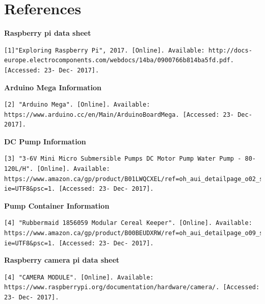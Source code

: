 \documentclass [10pt]{article}
\begin{document}
\section{References}


\textbf{Raspberry pi data sheet}
\begin{verbatim}
[1]"Exploring Raspberry Pi", 2017. [Online]. Available: http://docs-europe.electrocomponents.com/webdocs/14ba/0900766b814ba5fd.pdf. [Accessed: 23- Dec- 2017].
\end{verbatim}
\textbf{Arduino Mega Information}
\begin{verbatim}
[2] "Arduino Mega". [Online]. Available:
https://www.arduino.cc/en/Main/ArduinoBoardMega. [Accessed: 23- Dec- 2017].
\end{verbatim}
\textbf{DC Pump Information}
\begin{verbatim}
[3] "3-6V Mini Micro Submersible Pumps DC Motor Pump Water Pump - 80-120L/H". [Online]. Available:
https://www.amazon.ca/gp/product/B01LWQCXEL/ref=oh_aui_detailpage_o02_s00?ie=UTF8&psc=1. [Accessed: 23- Dec- 2017].
\end{verbatim}
\textbf{Pump Container Information}
\begin{verbatim}
[4] "Rubbermaid 1856059 Modular Cereal Keeper". [Online]. Available: https://www.amazon.ca/gp/product/B00BEUDXRW/ref=oh_aui_detailpage_o09_s00?ie=UTF8&psc=1. [Accessed: 23- Dec- 2017].
\end{verbatim}

\textbf{Raspberry camera pi data sheet}
\begin{verbatim}
[4] "CAMERA MODULE". [Online]. Available:
https://www.raspberrypi.org/documentation/hardware/camera/. [Accessed: 23- Dec- 2017].
\end{verbatim}
\end{document}
